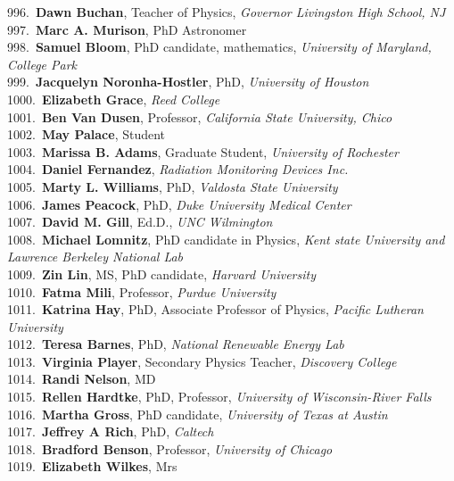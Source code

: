996.~{\bf Dawn Buchan}, Teacher of Physics, {\sl Governor Livingston High School, NJ} \\
997.~{\bf Marc A. Murison}, PhD Astronomer \\
998.~{\bf Samuel Bloom}, PhD candidate, mathematics, {\sl University of Maryland, College Park} \\
999.~{\bf Jacquelyn Noronha-Hostler}, PhD, {\sl University of Houston} \\
1000.~{\bf Elizabeth Grace}, {\sl Reed College} \\
1001.~{\bf Ben Van Dusen}, Professor, {\sl California State University, Chico} \\
1002.~{\bf May Palace}, Student \\
1003.~{\bf Marissa B. Adams}, Graduate Student, {\sl University of Rochester} \\
1004.~{\bf Daniel Fernandez}, {\sl Radiation Monitoring Devices Inc.} \\
1005.~{\bf Marty L. Williams}, PhD, {\sl Valdosta State University} \\
1006.~{\bf James Peacock}, PhD, {\sl Duke University Medical Center} \\
1007.~{\bf David M. Gill}, Ed.D., {\sl UNC Wilmington} \\
1008.~{\bf Michael Lomnitz}, PhD candidate in Physics, {\sl Kent state University and Lawrence Berkeley National Lab} \\
1009.~{\bf Zin Lin}, MS, PhD candidate, {\sl Harvard University} \\
1010.~{\bf Fatma Mili}, Professor, {\sl Purdue University} \\
1011.~{\bf Katrina Hay}, PhD, Associate Professor of Physics, {\sl Pacific Lutheran University} \\
1012.~{\bf Teresa Barnes}, PhD, {\sl National Renewable Energy Lab} \\
1013.~{\bf Virginia Player}, Secondary Physics Teacher, {\sl Discovery College } \\
1014.~{\bf Randi Nelson}, MD \\
1015.~{\bf Rellen Hardtke}, PhD, Professor, {\sl University of Wisconsin-River Falls} \\
1016.~{\bf Martha Gross}, PhD candidate, {\sl University of Texas at Austin} \\
1017.~{\bf Jeffrey A Rich}, PhD, {\sl Caltech} \\
1018.~{\bf Bradford Benson}, Professor, {\sl University of Chicago} \\
1019.~{\bf Elizabeth Wilkes}, Mrs \\
